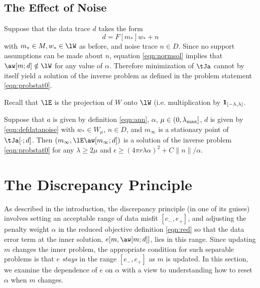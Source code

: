 \subsection{The Effect of Noise}
Suppose that the data trace $d$ takes the form
\begin{equation}
  \label{eqn:defdatanoisy}
  d = F[m_*]w_* + n
\end{equation}
with $m_* \in M, w_* \in \lW$ as before, and noise trace $n \in
D$. Since no support assumptions can be made about $n$, equation
\ref{eqn:normsol} implies that $\aw[m;d] \notin \lW$ for any value of
$\alpha$.  Therefore minimization of $\tJa$ cannot by itself yield a
solution of the inverse problem as defined in the problem statement
\ref{eqn:probstat0}.

Recall that $\lE$ is the projection of $W$ onto $\lW$
(i.e. multiplication by ${\bf 1}_{[-\lambda,\lambda]}$.

\begin{theorem}
  \label{thm:ipnoisesuf}
  Suppose that $a$ is given by definition \ref{eqn:ann}, $\alpha$,
  $\mu \in (0,\lambda_{\rm max}]$, $d$ is given by
  \ref{eqn:defdatanoise} with $w_* \in W_{\mu}$, $n \in D$, and
  $m_{\infty}$ is a stationary point of $\tJa[\cdot;d]$. Then
  $(m_{\infty},\lE\aw[m_{\infty};d])$ is a solution of the inverse
  problem \ref{eqn:probstat0} for any $\lambda \ge 2\mu$ and
  $\epsilon \ge (4\pi r \lambda \alpha)^2 + C\|n\|/\alpha$.
\end{theorem}

\section{The Discrepancy Principle}
As described in the introduction, the discrepancy principle (in one of
its guises) involves setting an acceptable range of data misfit
$[e_-,e_+]$, and adjusting the penalty weight $\alpha$ in the reduced
objective definition \ref{eqn:red} so that the data error term at the
inner solution, $e[m,\aw[m;d]]$, lies in this range. Since updating
$m$ changes the inner problem, the appropriate condition for such
separable problems is that $e$ {\em stays} in the range $[e_-,e_+]$ as
$m$ is updated. In this section, we examine the dependence of $e$
on $\alpha$ with a view to understanding how to reset $\alpha$ when
$m$ changes.

